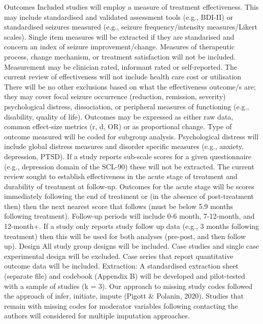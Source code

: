 \documentclass[
  12pt,
  openany]{book}
\begin{document}
Outcomes
Included studies will employ a measure of treatment effectiveness. This may include standardised and validated assessment tools (e.g., BDI-II) or standardised seizures measured (e.g., seizure frequency/intensity measures/Likert scales). Single item measures will be extracted if they are standarised and concern an index of seizure improvement/change. Measures of therapeutic process, change mechanism, or treatment satisfaction will not be included. Measurement may be clinician rated, informant rated or self-reported. The current review of effectiveness will not include health care cost or utilisation There will be no other exclusions based on what the effectiveness outcome/s are; they may cover focal seizure occurrence (reduction, remission, severity) psychological distress, dissociation, or peripheral measures of functioning (e.g., disability, quality of life). Outcomes may be expressed as either raw data, common effect-size metrics (r, d, OR) or as proportional change. Type of outcome measured will be coded for subgroup analysis. Psychological distress will include global distress measures and disorder specific measures (e.g., anxiety, depression, PTSD). If a study reports sub-scale scores for a given questionnaire (e.g., depression domain of the SCL-90) these will not be extracted.
The current review sought to establish effectiveness in the acute stage of treatment and durability of treatment at follow-up. Outcomes for the acute stage will be scores immediately following the end of treatment or (in the absence of post-treatment then) then the next nearest score that follows (must be below 5.9 months following treatment). Follow-up periods will include 0-6 month, 7-12-month, and 12-month+. If a study only reports study follow up data (e.g., 3 months following treatment) then this will be used for both analyses (pre-post, and then follow up).
Design
All study group designs will be included. Case studies and single case experimental design will be excluded. Case series that report quantitative outcome data will be included.
Extraction:
A standardised extraction sheet (separate file) and codebook (Appendix B) will be developed and pilot-tested with a sample of studies (k = 3). Our approach to missing study codes followed the approach of infer, initiate, impute (Pigott \& Polanin, 2020). Studies that remain with missing codes for moderator variables following contacting the authors will considered for multiple imputation approaches.
\end{document}
